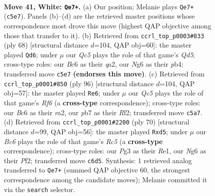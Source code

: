 \documentclass[11pt]{article}
\begin{document}
\clearpage

\begin{figure}[p]\centering
\begin{subfigure}{0.46\textwidth}\centering
\resizebox{\linewidth}{!}{%
\newchessgame
\chessboard[
  setfen={r7/1pk3p1/p1B1npN1/2Q5/3R3p/4P1P1/PPR2P1P/7K w - - 1 41},
  showmover=false,
  pgfstyle=straightmove, color=movearrow, markmove={c5-e7}
]}
\caption{}
\end{subfigure}\hfill
\begin{subfigure}{0.46\textwidth}\centering
\resizebox{\linewidth}{!}{%
\newchessgame
\chessboard[
  setfen={2b2r1k/6p1/p4p1p/P2Qp3/1pB5/1Pn1P2P/q4PP1/3R2K1 w - - 4 35},
  showmover=false,
  pgfstyle=straightmove, color=movearrow, markmove={d5-d6}
]}
\caption{}
\end{subfigure}
\\[4pt]
\begin{subfigure}{0.46\textwidth}\centering
\resizebox{\linewidth}{!}{%
\newchessgame
\chessboard[
  setfen={r7/4qB1k/1Qp2Rp1/4n2p/2P4P/1P4P1/r4RK1/8 w - - 3 49},
  showmover=false,
  pgfstyle=straightmove, color=movearrow, markmove={f6-e6}
]}
\caption{}
\end{subfigure}\hfill
\begin{subfigure}{0.46\textwidth}\centering
\resizebox{\linewidth}{!}{%
\newchessgame
\chessboard[
  setfen={3r2k1/5pp1/7p/p1Rp3n/P2Qp2P/2P3Pq/5P2/4R1K1 w - - 0 36},
  showmover=false,
  pgfstyle=straightmove, color=movearrow, markmove={c5-d5}
]}
\caption{}
\end{subfigure}
\caption{\textbf{Move 41, White: \texttt{Qe7+}.} (a) Our position; Melanie plays \texttt{Qe7+} (\texttt{c5e7}). Panels (b)--(d) are the retrieved master positions whose correspondence most drove this move (highest QAP objective among those that transfer to it). (b) Retrieved from \texttt{ccrl\_top\_p0003\#833} (ply 68) [structural distance $d$=104, QAP obj=60]: the master played \texttt{Qd6}; under $\mu$ our \emph{Qc5} plays the role of that game's \emph{Qd5}; cross-type roles: our \emph{B}c6 as their \emph{q}a2, our \emph{N}g6 as their \emph{p}b4; transferred move \texttt{c5e7} \textbf{(endorses this move)}. (c) Retrieved from \texttt{ccrl\_top\_p0001\#850} (ply 96) [structural distance $d$=104, QAP obj=57]: the master played \texttt{Re6}; under $\mu$ our \emph{Qc5} plays the role of that game's \emph{Rf6} (a \textbf{cross-type} correspondence); cross-type roles: our \emph{B}c6 as their \emph{r}a2, our \emph{p}b7 as their \emph{R}f2; transferred move \texttt{c5a7}. (d) Retrieved from \texttt{ccrl\_top\_p0001\#2200} (ply 70) [structural distance $d$=99, QAP obj=56]: the master played \texttt{Rxd5}; under $\mu$ our \emph{Bc6} plays the role of that game's \emph{Rc5} (a \textbf{cross-type} correspondence); cross-type roles: our \emph{P}g3 as their \emph{R}e1, our \emph{N}g6 as their \emph{P}f2; transferred move \texttt{c6d5}. Synthesis: 1 retrieved analog transferred to \texttt{Qe7+} (summed QAP objective 60, the strongest correspondence among the candidate moves); Melanie committed it via the \texttt{search} selector.}
\label{fig:thought-m80}
\end{figure}
\end{document}
